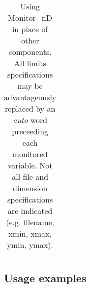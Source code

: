 \begin{table}
\begin{center}
{\begin{tabular}{|p{}|p{}|}
\hline
    \end{tabular}
    \caption{Using Monitor\_nD in place of other components. All limits specifications may be advantageously replaced by an \textit{auto} word preceeding each monitored variable. Not all file and dimension specifications are indicated (e.g. filename, xmin, xmax, ymin, ymax).}
    \label{t:monitor-nd-equiv}
    }
  \end{center}
\end{table}

\subsection{Usage examples}

